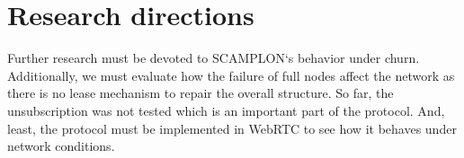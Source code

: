 \documentclass[11pt, english, screen]{report-rd-info}
\begin{document}
\section{Research directions}

Further research must be devoted to SCAMPLON`s behavior under churn.
Additionally, we must evaluate how the failure of full nodes affect the network as there is no lease mechanism to repair the overall structure.
So far, the unsubscription was not tested which is an important part of the protocol.
And, least, the protocol must be implemented in WebRTC to see how it behaves under network conditions.


\nocite{*} %

%


\listoffigures{}

\listoftables{}

\listofalgorithms{}

\appendix







\end{document}
